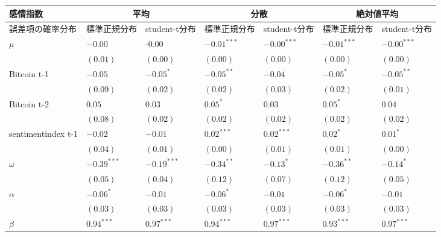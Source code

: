 \begin{landscape}
\begin{table}[]
\begin{tabular}{lllllll}
\hline
感情指数               & \multicolumn{2}{c}{平均}        & \multicolumn{2}{c}{分散}        & \multicolumn{2}{c}{絶対値平均}     \\ \hline
誤差項の確率分布           & 標準正規分布        & student-t分布   & 標準正規分布        & student-t分布   & 標準正規分布        & student-t分布   \\ \hline
$\mu$              & $-0.00$       & -0.00         & $-0.01^{***}$ & $-0.00^{***}$ & $-0.01^{***}$ & $-0.00^{***}$ \\
                   & $(0.01)$      & $(0.00)$      & $(0.00)$      & $(0.00)$      & $(0.00)$      & $(0.00)$      \\
Bitcoin t-1        & $-0.05$       & $-0.05^{*}$   & $-0.05^{**}$  & $-0.04$       & $-0.05^{*}$   & $-0.05^{**}$  \\
                   & $(0.09)$      & $(0.02)$      & $(0.02)$      & $(0.03)$      & $(0.02)$      & $(0.01)$      \\
Bitcoin t-2        & $0.05$        & $0.03$        & $0.05^{*}$    & $0.03$        & $0.05^{*}$    & $0.04$        \\
                   & $(0.08)$      & $(0.02)$      & $(0.02)$      & $(0.02)$      & $(0.02)$      & $(0.02)$      \\
sentimentindex t-1 & $-0.02$       & $-0.01$       & $0.02^{***}$  & $0.02^{***}$  & $0.02^{*}$    & $0.01^{*}$    \\
                   & $(0.04)$      & $(0.01)$      & $(0.00)$      & $(0.01)$      & $(0.01)$      & $(0.00)$      \\
$\omega$           & $-0.39^{***}$ & $-0.19^{***}$ & $-0.34^{**}$  & $-0.13^{*}$   & $-0.36^{**}$  & $-0.14^{*}$   \\
                   & $(0.05)$      & $(0.04)$      & $(0.12)$      & $(0.07)$      & $(0.12)$      & $(0.05)$      \\
$\alpha$           & $-0.06^{*}$   & $-0.01$       & $-0.06^{*}$   & $-0.01$       & $-0.06^{*}$   & $-0.01$       \\
                   & $(0.03)$      & $(0.03)$      & $(0.03)$      & $(0.03)$      & $(0.03)$      & $(0.03)$      \\
$\beta$            & $0.94^{***}$  & $0.97^{***}$  & $0.94^{***}$  & $0.97^{***}$  & $0.93^{***}$  & $0.97^{***}$  \\

\end{tabular}
\end{table}
\end{landscape}
